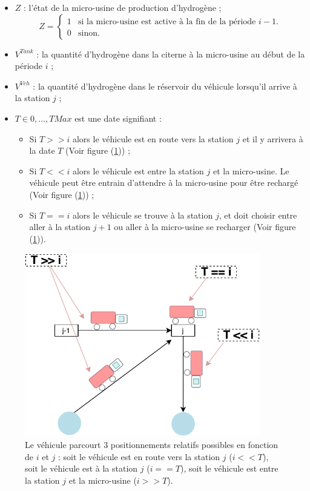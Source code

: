 \begin{itemize}[label=$\square$]
	\item $Z$ : l'état de la micro-usine de production d'hydrogène ;
	$$
	Z= \left\{
	\begin{array}{ll}
	1 & \mbox{si la micro-usine est active à la fin de la période $i-1$.} \\
	0 & \mbox{sinon.}
	\end{array}
	\right.
	$$
	\item $V^{Tank} $ : la quantité d'hydrogène dans la citerne à la micro-usine au début de la période $i$ ;
	
	\item $V^{Veh} $ : la quantité d'hydrogène dans le réservoir du véhicule lorsqu'il arrive à la station $j$ ;
	
	\item $T \in 0, \dots, TMax$ est une date signifiant :
	\begin{itemize}
		\item Si $T >> i$ alors le véhicule est en route vers la station $j$ et il y arrivera à la date $T$ (Voir figure (\ref{positions_vehicule})) ;
		\item Si $T<<i$ alors le véhicule est entre la station $j$ et la micro-usine. Le véhicule peut être entrain d'attendre à la micro-usine pour être rechargé (Voir figure (\ref{positions_vehicule})) ;
		\item Si $T==i$ alors le véhicule se trouve à la station $j$, et doit choisir entre aller à la station $j+1$ ou aller à la micro-usine se recharger (Voir figure (\ref{positions_vehicule})).
	\end{itemize}
\end{itemize}
\begin{figure}[H]
	\centerline{
		\includegraphics[height=8cm]{images_these/positions_vehicule.pdf}}
	\caption[Positionnements relatifs du véhicule par rapport à une station]{Le véhicule parcourt 3 positionnements relatifs possibles en fonction de $i$ et $j$ : soit le véhicule est en route vers la station $j$ ($i<<T$), soit le véhicule est à la station $j$ ($i==T$), soit le véhicule est entre la station $j$ et la micro-usine ($i>>T$).}
	\label{positions_vehicule}
\end{figure}
